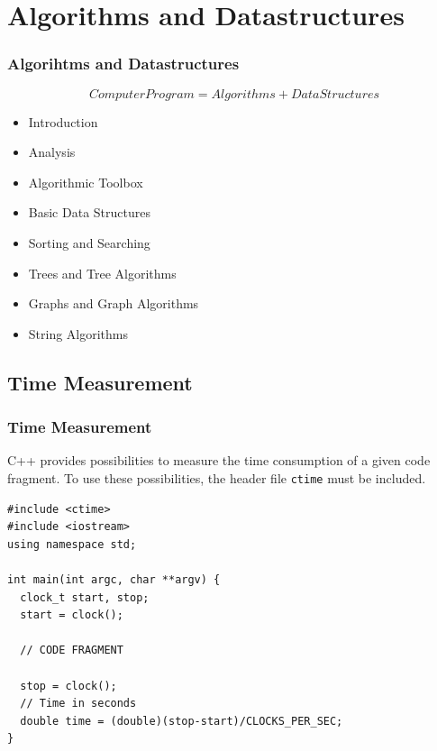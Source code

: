 \section{Algorithms and Datastructures}
\begin{frame}[fragile]
\frametitle{Algorihtms and Datastructures}
\begin{displaymath}
Computer Program = Algorithms + Data Structures
\end{displaymath}
\begin{itemize}
\item Introduction
\item Analysis
\item Algorithmic Toolbox
\item Basic Data Structures
\item Sorting and Searching
\item Trees and Tree Algorithms
\item Graphs and Graph Algorithms
\item String Algorithms
\end{itemize}
\end{frame}

\subsection{Time Measurement}
\begin{frame}[fragile]
\frametitle{Time Measurement}
C++ provides possibilities to measure the time consumption of a given
code fragment. To use these possibilities, the header file \verb|ctime|
must be included.

{\tiny
\begin{lstlisting}
#include <ctime>
#include <iostream>
using namespace std;

int main(int argc, char **argv) {
  clock_t start, stop;
  start = clock();

  // CODE FRAGMENT

  stop = clock();
  // Time in seconds
  double time = (double)(stop-start)/CLOCKS_PER_SEC;
}
\end{lstlisting}
}
\end{frame}

